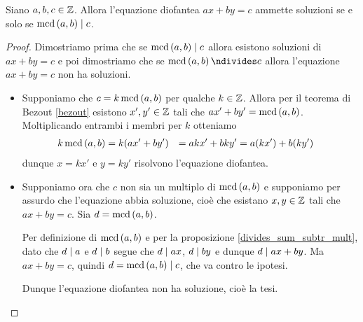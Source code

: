 \begin{theorem}
    Siano $a, b, c \in \mathbb{Z}$. Allora l'equazione diofantea $ax + by = c$ ammette soluzioni se e solo se $\operatorname{mcd}\left(a, b\right) \mid c$.
\end{theorem}
\begin{proof}
    Dimostriamo prima che se $\operatorname{mcd}\left(a, b\right) \mid c$ allora esistono soluzioni di $ax + by = c$ e poi dimostriamo che se $\mcd{a}{b} \ndivides c$ allora l'equazione $ax + by = c$ non ha soluzioni.
    \begin{itemize}
        \item Supponiamo che $c = k\operatorname{mcd}\left(a, b\right)$ per qualche $k \in \mathbb{Z}$. Allora per il teorema di Bezout \ref{bezout} esistono $x', y^\prime \in \mathbb{Z}$ tali che $ax^\prime + by^\prime = \operatorname{mcd}\left(a, b\right)$. Moltiplicando  entrambi i membri per $k$ otteniamo
        \begin{alignat*}{2} 
            k\operatorname{mcd}\left(a, b\right) &= k(ax^\prime + by')
                        &= akx^\prime + bky'
                        &= a(kx') + b(ky')
        \end{alignat*}
        dunque $x = kx'$ e $y = ky'$ risolvono l'equazione diofantea.
        \item Supponiamo ora che $c$ non sia un multiplo di $\operatorname{mcd}\left(a, b\right)$ e supponiamo per assurdo che l'equazione abbia soluzione, cioè che esistano $x, y \in \mathbb{Z}$ tali che $ax + by = c$. Sia $d = \operatorname{mcd}\left(a, b\right)$.
        
        Per definizione di $\operatorname{mcd}\left(a, b\right)$ e per la proposizione \ref{divides_sum_subtr_mult}, dato che $d \mid a$ e $d \mid b$ segue che $d \mid ax$, $d \mid by$ e dunque $d \mid ax + by$. Ma $ax + by = c$, quindi $d = \operatorname{mcd}\left(a, b\right) \mid c$, che va contro le ipotesi.

        Dunque l'equazione diofantea non ha soluzione, cioè la tesi. \qedhere
    \end{itemize}
\end{proof}

